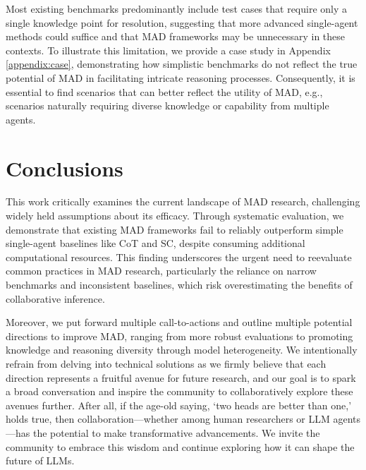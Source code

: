  Most existing benchmarks predominantly include test cases that require only a single knowledge point for resolution, suggesting that more advanced single-agent methods could suffice and that MAD frameworks may be unnecessary in these contexts. %
To illustrate this limitation, we provide a case study in Appendix \ref{appendix:case}, demonstrating how simplistic benchmarks do not reflect the true potential of MAD in facilitating intricate reasoning processes. Consequently, it is essential to find scenarios that can better reflect the utility of MAD, e.g., scenarios naturally requiring diverse knowledge or capability from multiple agents.

\section{Conclusions}
This work critically examines the current landscape of MAD research, challenging widely held assumptions about its efficacy. Through systematic evaluation, we demonstrate that existing MAD frameworks fail to reliably outperform simple single-agent baselines like CoT and SC, despite consuming additional computational resources. This finding underscores the urgent need to reevaluate common practices in MAD research, particularly the reliance on narrow benchmarks and inconsistent baselines, which risk overestimating the benefits of collaborative inference.

Moreover, we put forward multiple call-to-actions and outline multiple potential directions to improve MAD, ranging from more robust evaluations to promoting knowledge and reasoning diversity through model heterogeneity. We intentionally refrain from delving into technical solutions as we firmly believe that each direction represents a fruitful avenue for future research, and our goal is to spark a broad conversation and inspire the community to collaboratively explore these avenues further. After all, if the age-old saying, `two heads are better than one,' holds true, then collaboration---whether among human researchers or LLM agents---has the potential to make transformative advancements. We invite the community to embrace this wisdom and continue exploring how it can shape the future of LLMs.


